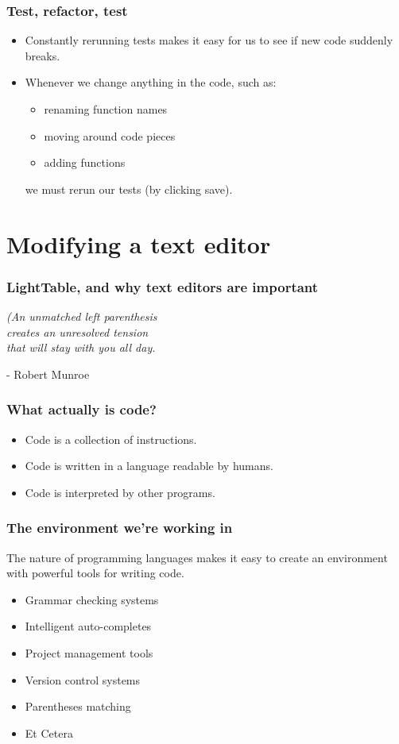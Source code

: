 \documentclass{beamer}
\begin{document}
\begin{frame}[fragile]
\frametitle{Test, refactor, test}
\begin{itemize}
\item Constantly rerunning tests makes it easy for us to see if new code suddenly breaks.
\item Whenever we change anything in the code, such as:
\begin{itemize}
\item renaming function names
\item moving around code pieces
\item adding functions
\end{itemize}
we must rerun our tests (by clicking save).
\end{itemize}		
\end{frame}

\section{Modifying a text editor}

\begin{frame}
\frametitle{LightTable, and why text editors are important}
	\begin{center}
	{\em (An unmatched left parenthesis\\ creates an unresolved tension\\ that will stay with you all day.}	

	\vspace*{2\baselineskip}
	- Robert Munroe
	\end{center}
\end{frame}

\begin{frame}
\frametitle{What actually is code?}
	\begin{itemize}
	\item Code is a collection of instructions.
	\item Code is written in a language readable by humans.
	\item Code is interpreted by other programs.
	\end{itemize}
\end{frame}

\begin{frame}
\frametitle{The environment we're working in}
	The nature of programming languages makes it easy to create an environment with powerful tools for writing code.
	{\em
	\begin{itemize}
	\item Grammar checking systems
	\item Intelligent auto-completes
	\item Project management tools
	\item Version control systems
	\item Parentheses matching
	\item Et Cetera
	\end{itemize}
	}
\end{frame}
\end{document}
